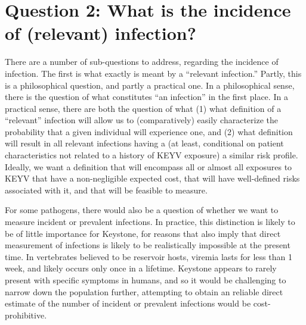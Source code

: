 \documentclass[12pt]{article}
\newcommand{\cjh}{\textcolor{blue}{cjh}}
\newcommand{\tjh}{\textcolor{red}{tjh}}
\newcommand{\msg}[3]{(#1 $\rightarrow$ #2: #3)}
\newcommand{\mtc}[1]{\msg\tjh\cjh{#1}}
\begin{document}
    \section[Incidence of infection]{Question 2: What is the incidence of (relevant) infection?}
        \label{incidence}

        There are a number of sub-questions to address, regarding the incidence of infection. The first is what exactly is meant by a ``relevant infection.'' Partly, this is a philosophical question, and partly a practical one. In a philosophical sense, there is the question of what constitutes ``an infection'' in the first place. In a practical sense, there are both the question of what (1) what definition of a ``relevant'' infection will allow us to (comparatively) easily characterize the probability that a given individual will experience one, and (2) what definition will result in all relevant infections having a (at least, conditional on patient characteristics not related to a history of KEYV exposure) a similar risk profile. Ideally, we want a definition that will encompass all or almost all exposures to KEYV that have a non-negligible expected cost, that will have well-defined risks associated with it, and that will be feasible to measure.

        For some pathogens, there would also be a question of whether we want to measure incident or prevalent infections. In practice, this distinction is likely to be of little importance for Keystone, for reasons that also imply that direct measurement of infections is likely to be realistically impossible at the present time. In vertebrates believed to be reservoir hosts, viremia lasts for less than 1 week, and likely occurs only once in a lifetime\cite{watts1988maintenance,watts1979experimental}. Keystone appears to rarely present with specific symptoms in humans, and so it would be challenging to narrow down the population further, attempting to obtain an reliable direct estimate of the number of incident or prevalent infections would be cost-prohibitive.
        
\end{document}
